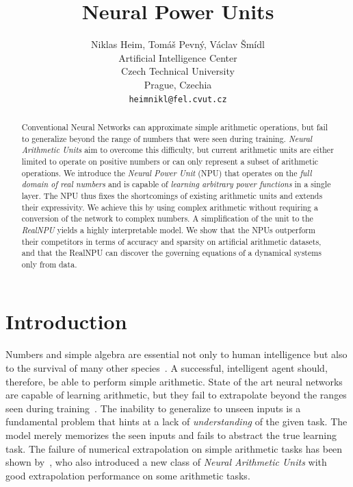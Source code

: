 \documentclass[9pt]{article}
\title{Neural Power Units}
\author{
    Niklas Heim, Tom\'a\v s Pevn\'y, V\'aclav \v Sm\'idl \\
    Artificial Intelligence Center\\
    Czech Technical University\\
    Prague, Czechia\\
    \texttt{heimnikl@fel.cvut.cz}
}
\begin{document}
\maketitle

\begin{abstract}
  Conventional Neural Networks can approximate simple arithmetic operations,
  but fail to generalize beyond the range of numbers that were seen during
  training.  \emph{Neural Arithmetic Units} aim to overcome this difficulty,
  but current arithmetic units are either limited to operate on positive
  numbers or can only represent a subset of arithmetic operations. We introduce
  the \emph{Neural Power Unit} (NPU) that operates on the \emph{full domain of
  real numbers} and is capable of \emph{learning arbitrary power functions} in
  a single layer.  The NPU thus fixes the shortcomings of existing arithmetic
  units and extends their expressivity. We achieve this by using
  complex arithmetic without requiring a conversion of the network to complex
  numbers. A simplification of the unit to the \emph{RealNPU} yields a highly interpretable model.
  We show that the NPUs outperform their competitors in terms of
  accuracy and sparsity on artificial arithmetic datasets, and that the RealNPU can discover
  the governing equations of a dynamical systems only from data.
\end{abstract}


\section{Introduction}%
\label{sec:introduction}

Numbers and simple algebra are essential not only to human intelligence but
also to the survival of many other
species~\citep{dehaene_number_2011,gallistel_finding_2018}. A successful,
intelligent agent should, therefore, be able to perform simple arithmetic.  State
of the art neural networks are capable of learning arithmetic, but they
fail to extrapolate beyond the ranges seen during
training~\citep{suzgun_evaluating_2018,lake_generalization_2018}.  The
inability to generalize to unseen inputs is a fundamental problem that hints at
a lack of \emph{understanding} of the given task. The model merely memorizes
the seen inputs and fails to abstract the true learning task.  The failure of
numerical extrapolation on simple arithmetic tasks has been shown
by~\cite{trask_neural_2018}, who also introduced a new class of \emph{Neural
Arithmetic Units} with good extrapolation performance on some arithmetic
tasks.
\end{document}
